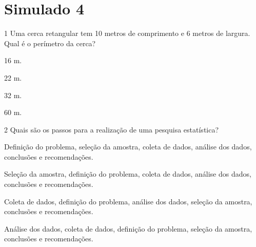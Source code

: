 

\pagebreak

\mbox{}



\pagebreak

\section*{Simulado 4}

\num{1} Uma cerca retangular tem 10 metros de comprimento e 6 metros de
largura. Qual é o perímetro da cerca?

\begin{escolha}
\item 16 m.
\item 22 m.
\item 32 m.
\item 60 m.
\end{escolha}







\num{2} Quais são os passos para a realização de uma pesquisa estatística?

\begin{escolha}
\item Definição do problema, seleção da amostra, coleta de dados, análise
dos dados, conclusões e recomendações.
\item Seleção da amostra, definição do problema, coleta de dados, análise
dos dados, conclusões e recomendações.
\item Coleta de dados, definição do problema, análise dos dados, seleção da
amostra, conclusões e recomendações.
\item Análise dos dados, coleta de dados, definição do problema, seleção da
amostra, conclusões e recomendações.
\end{escolha}

